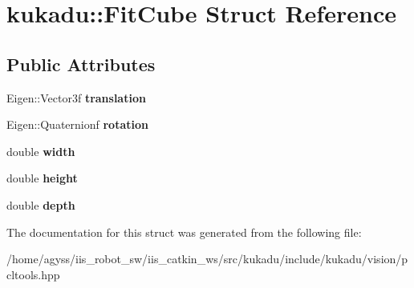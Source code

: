 \hypertarget{structkukadu_1_1FitCube}{}\section{kukadu\+:\+:Fit\+Cube Struct Reference}
\label{structkukadu_1_1FitCube}
\subsection*{Public Attributes}
\begin{DoxyCompactItemize}
\item 
Eigen\+::\+Vector3f {\bfseries translation}\hypertarget{structkukadu_1_1FitCube_a3c6db4d46c8590ff97dbbff598582a97}{}\label{structkukadu_1_1FitCube_a3c6db4d46c8590ff97dbbff598582a97}

\item 
Eigen\+::\+Quaternionf {\bfseries rotation}\hypertarget{structkukadu_1_1FitCube_a29b6a3208ee456ff1be675f437207181}{}\label{structkukadu_1_1FitCube_a29b6a3208ee456ff1be675f437207181}

\item 
double {\bfseries width}\hypertarget{structkukadu_1_1FitCube_a043b12b7b4ba7816f111bfd78c042c67}{}\label{structkukadu_1_1FitCube_a043b12b7b4ba7816f111bfd78c042c67}

\item 
double {\bfseries height}\hypertarget{structkukadu_1_1FitCube_a3980860da490da901f8358d26d70aa80}{}\label{structkukadu_1_1FitCube_a3980860da490da901f8358d26d70aa80}

\item 
double {\bfseries depth}\hypertarget{structkukadu_1_1FitCube_a82c207a4ab142db5de51545a46be6e57}{}\label{structkukadu_1_1FitCube_a82c207a4ab142db5de51545a46be6e57}

\end{DoxyCompactItemize}


The documentation for this struct was generated from the following file\+:\begin{DoxyCompactItemize}
\item 
/home/agyss/iis\+\_\+robot\+\_\+sw/iis\+\_\+catkin\+\_\+ws/src/kukadu/include/kukadu/vision/pcltools.\+hpp\end{DoxyCompactItemize}
